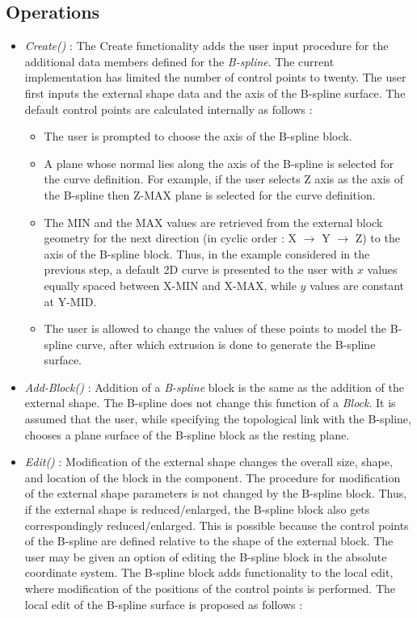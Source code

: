     \subsection{Operations}

        \begin{itemize}
        \item
        {\em Create()} : The Create functionality adds the user input procedure
        for the additional data members defined for the {\em B-spline}.
		The current implementation has limited the number of control
		points to twenty. The user first inputs the external shape data and
		the axis of the B-spline surface. The default control points are
		calculated internally as follows :
			\begin{itemize}
			\item
			The user is prompted to choose the axis of the B-spline block.
			\item
			A plane whose normal lies along the axis of the B-spline is selected
			for the curve definition. For example, if the user selects Z axis
			as the axis of the B-spline then Z-MAX plane is selected for the
			curve definition.

			\item
			The MIN and the MAX values are retrieved from the external block
			geometry for the next direction (in cyclic order : X 
			$\rightarrow$ Y $\rightarrow$ Z) to the axis of the B-spline block.
			Thus, in the example considered in the previous step, a default
			2D curve is presented to the  user with $x$ values equally spaced
			between X-MIN and X-MAX, while $y$ values are constant at Y-MID.

			\item
			The user is allowed to change the values of these points to model
			the B-spline curve, after which extrusion is done to generate the 
			B-spline surface.
			\end{itemize}


        \item
        {\em Add-Block()} : Addition of a {\em B-spline} block is the same as 
		the addition of the external shape. The B-spline does not change this
		function of a {\em Block}. It is assumed that the user,
		while specifying the topological link with the B-spline, chooses a
		plane surface of the B-spline block as the resting plane.
		
		\item
		{\em Edit()} : Modification of the external shape changes the overall 
		size, shape, 
		and location of the block in the component. The procedure for 
		modification of the
		external shape parameters is not changed by the B-spline block. 
		Thus, if the external shape is reduced/enlarged, the B-spline block
		also gets correspondingly reduced/enlarged. This is possible because
		the control points of the B-spline are defined relative to the shape
		of the external block. The user may be given an option of editing the
		B-spline block in the absolute coordinate system. The 
		B-spline block
		adds functionality to the local edit, where modification of the
		positions of the
		control points is performed. The local edit of the B-spline surface is 
		proposed as follows :


\end{itemize}
